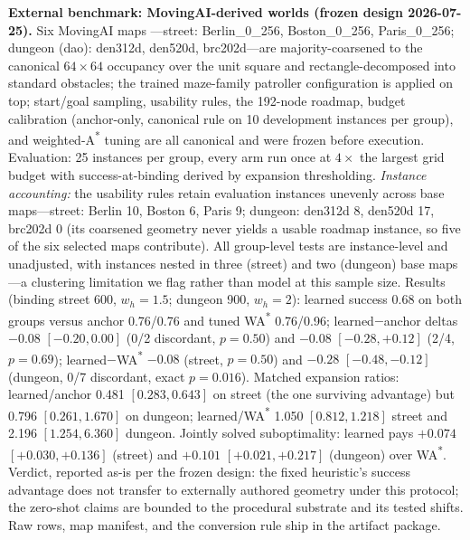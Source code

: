 \documentclass[letterpaper]{article} %
\begin{document}
\textbf{External benchmark: MovingAI-derived worlds (frozen design 2026-07-25).} Six MovingAI maps \citep{sturtevant2012movingai}---street: Berlin\_0\_256, Boston\_0\_256, Paris\_0\_256; dungeon (dao): den312d, den520d, brc202d---are majority-coarsened to the canonical $64{\times}64$ occupancy over the unit square and rectangle-decomposed into standard obstacles; the trained maze-family patroller configuration is applied on top; start/goal sampling, usability rules, the 192-node roadmap, budget calibration (anchor-only, canonical rule on 10 development instances per group), and weighted-A\textsuperscript{*} tuning are all canonical and were frozen before execution. Evaluation: 25 instances per group, every arm run once at $4\times$ the largest grid budget with success-at-binding derived by expansion thresholding. \emph{Instance accounting:} the usability rules retain evaluation instances unevenly across base maps---street: Berlin 10, Boston 6, Paris 9; dungeon: den312d 8, den520d 17, brc202d 0 (its coarsened geometry never yields a usable roadmap instance, so five of the six selected maps contribute). All group-level tests are instance-level and unadjusted, with instances nested in three (street) and two (dungeon) base maps---a clustering limitation we flag rather than model at this sample size. Results (binding street 600, $w_h{=}1.5$; dungeon 900, $w_h{=}2$): learned success 0.68 on both groups versus anchor 0.76/0.76 and tuned WA\textsuperscript{*} 0.76/0.96; learned$-$anchor deltas $-0.08$ $[-0.20, 0.00]$ (0/2 discordant, $p{=}0.50$) and $-0.08$ $[-0.28, +0.12]$ (2/4, $p{=}0.69$); learned$-$WA\textsuperscript{*} $-0.08$ (street, $p{=}0.50$) and $-0.28$ $[-0.48,-0.12]$ (dungeon, 0/7 discordant, exact $p{=}0.016$). Matched expansion ratios: learned/anchor 0.481 $[0.283, 0.643]$ on street (the one surviving advantage) but 0.796 $[0.261, 1.670]$ on dungeon; learned/WA\textsuperscript{*} 1.050 $[0.812, 1.218]$ street and 2.196 $[1.254, 6.360]$ dungeon. Jointly solved suboptimality: learned pays $+0.074$ $[+0.030, +0.136]$ (street) and $+0.101$ $[+0.021, +0.217]$ (dungeon) over WA\textsuperscript{*}. Verdict, reported as-is per the frozen design: the fixed heuristic's success advantage does not transfer to externally authored geometry under this protocol; the zero-shot claims are bounded to the procedural substrate and its tested shifts. Raw rows, map manifest, and the conversion rule ship in the artifact package.
\end{document}

